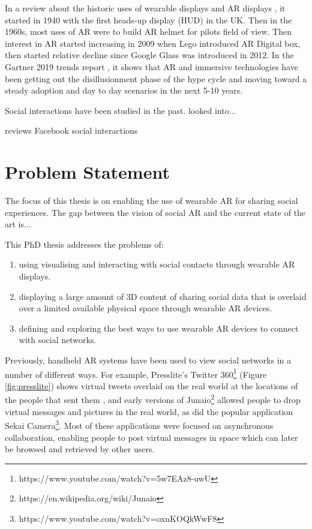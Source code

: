 In a review about the historic uses of wearable displays and AR displays \cite{Peddie2017}, it started in 1940 with the first heads-up display (HUD) in the UK. Then in the 1960s, most uses of AR were to build AR helmet for pilots field of view. Then interest in AR started increasing in 2009 when Lego introduced AR Digital box, then started relative decline since Google Glass was introduced in 2012. In the Gartner 2019 trends report \cite{gartner2019}, it shows that AR and immersive technologies have been getting out the disillusionment phase of the hype cycle and moving toward a steady adoption and day to day scenarios in the next 5-10 years.

Social interactions have been studied in the past. 
\cite{AlanKellerGomes} looked into...

\cite{Damian2015}
\cite{Wilson2012a} reviews Facebook social interactions 

\section{Problem Statement}

The focus of this thesis is on enabling the use of wearable AR for sharing social experiences. The gap between the vision of social AR and the current state of the art is... 

This PhD thesis addresses the problems of: 

\begin{enumerate}
    \item using visualising and interacting with social contacts through wearable AR displays.
    \item displaying a large amount of 3D content of sharing social data that is overlaid over a limited available physical space through wearable AR devices.
    \item defining and exploring the best ways to use wearable AR devices to connect with social networks.
\end{enumerate}

Previously, handheld AR systems have been used to view social networks in a number of different ways. For example, Presslite's Twitter 360\footnote{https://www.youtube.com/watch?v=5w7EAz8-uwU} (Figure \ref{fig:presslite}) shows virtual tweets overlaid on the real world at the locations of the people that sent them , and early versions of Junaio\footnote{https://en.wikipedia.org/wiki/Junaio} allowed people to drop virtual messages and pictures in the real world, as did the popular application Sekai Camera\footnote{https://www.youtube.com/watch?v=oxnKOQkWwF8}. Most of these applications were focused on asynchronous collaboration, enabling people to post virtual messages in space which can later be browsed and retrieved by other users. 

